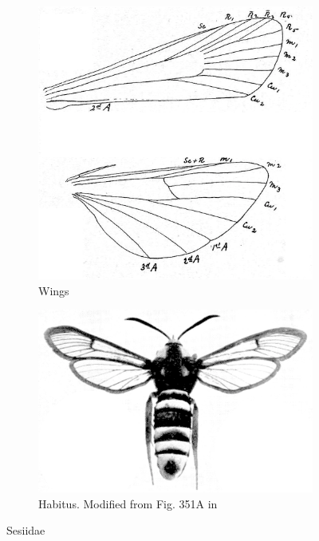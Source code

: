 \documentclass[letterpaper, 11pt]{article}
\begin{document}
\begin{figure}[ht!]
    \centering
    \begin{subfigure}[ht!]{0.4\textwidth}
        \includegraphics[width=\textwidth]{SesiidWings}
        \caption{Wings \citep[][Fig. 8]{bhl118765}}
        \label{fig:sesiid1}
    \end{subfigure}
    \hfill %
    \begin{subfigure}[ht!]{0.5\textwidth}
        \includegraphics[width=\textwidth]{sesiidHab.png}
        \caption{Habitus. Modified from Fig. 351A in \cite{escherich1914forstinsekten}}
        \label{fig:sesiid2}
    \end{subfigure}
    \caption{Sesiidae}\label{fig:sesiids}
\end{figure}
\end{document}
